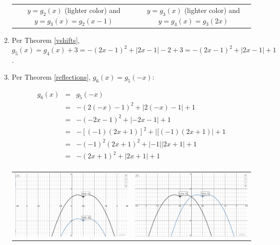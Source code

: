 \documentclass{ximera}
\begin{document}
\begin{example}
\begin{enumerate}
\begin{center}
\begin{tabular}{cc}
$y=g_{2}(x)$ (lighter color) and $y=g_{3}(x) = g_{2}(x-1)$ &  $y = g_{3}(x)$ (lighter color) and $y = g_{4}(x) = g_{3}(2x)$ \\

\end{tabular}

\end{center} 

\item  Per Theorem \ref{vshifts}, $g_{5}(x) = g_{4}(x)+3 =  -(2x-1)^2+|2x-1| - 2 + 3 =  -(2x-1)^2+|2x-1| +1$.

\item  Per Theorem \ref{reflections}, $g_{6}(x) = g_{5}(-x)$:

\[ \begin{array}{rcl}

g_{6}(x) & = & g_{5}(-x) \\
 &  = &  -(2(-x)-1)^2+|2(-x)-1|+1 \\
  &  = & -(-2x-1)^2+|-2x-1|+1 \\
  &  = &  -[(-1)(2x+1)]^2+|[(-1)(2x+1)|+1 \\
  &  = &   -(-1)^2(2x+1)^2+|-1||2x+1| + 1 \\
  & =  & -(2x+1)^2+|2x+1|+1 \\
  
  \end{array} \]

\begin{center}

\begin{tabular}{cc}

\includegraphics[width=3in]{./TransformationsGraphics/TransformationsEx04e.jpg} & \includegraphics[width=3in]{./TransformationsGraphics/TransformationsEx04f.jpg} \\


\end{tabular}
\end{center}
\end{enumerate}
\end{example}
\end{document}
